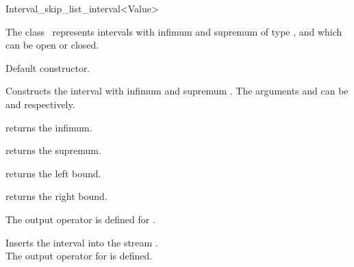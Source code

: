 \begin{ccRefClass} {Interval_skip_list_interval<Value>}

\ccDefinition

The class \ccClassTemplateName\ represents intervals with infimum 
and supremum of type , and which can be open or closed.


\ccThreeToTwo



\ccCreation
{}

{Default constructor.}

{Constructs the interval with infimum  and supremum .
The arguments  and  can be \ccc{,} and \ccc{,} respectively.}

\ccOperations

{returns the infimum.}

{returns the supremum.}

{returns the left bound.}

{returns the right bound.}


The output operator is defined for .

{Inserts the interval  into the stream .\\
\ccPrecond The output operator for  is defined.}

\end{ccRefClass}

